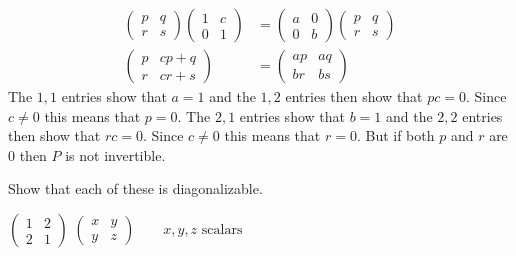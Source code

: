 \begin{exercises}
\begin{answer}
\begin{align*}
\begin{pmatrix}
            p  &q  \\
            r  &s
         \end{pmatrix}
         \begin{pmatrix}
            1  &c  \\
            0  &1
         \end{pmatrix}
         &=
         \begin{pmatrix}
            a  &0  \\
            0  &b
         \end{pmatrix}
         \begin{pmatrix}
            p  &q  \\
            r  &s
         \end{pmatrix}        \\
         \begin{pmatrix}
            p  &cp+q  \\
            r  &cr+s
         \end{pmatrix}
         &=
         \begin{pmatrix}
            ap  &aq  \\
            br  &bs
         \end{pmatrix}
      \end{align*}
      The \( 1,1 \) entries show that \( a=1 \) and the \( 1,2 \) entries
      then show that \( pc=0 \).
      Since \( c\neq 0 \) this means that \( p=0 \).
      The \( 2,1 \) entries show that 
      \( b=1 \) and the \( 2,2 \) entries then show that
      \( rc=0 \).
      Since \( c\neq 0 \) this means that \( r=0 \).
      But if both \( p \) and \( r \) are \( 0 \) then \( P \) is not
      invertible.  
     \end{answer}
  \item 
    Show that each of these is diagonalizable.
    \begin{exparts*}
      \partsitem
       \( \begin{pmatrix}
             1  &2  \\
             2  &1
          \end{pmatrix}  \)
      \partsitem
       \( \begin{pmatrix}
             x  &y  \\
             y  &z
          \end{pmatrix}
          \qquad \text{$x,y,z$ scalars}  \)
    \end{exparts*}
    \begin{answer}
      \begin{exparts}

\end{exparts}
\end{answer}
\end{exercises}
